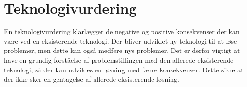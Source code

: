 \section{Teknologivurdering}
En teknologivurdering klarlægger de negative og positive konsekvenser der kan være ved en eksisterende teknologi. Der bliver udviklet ny teknologi til at løse problemer, men dette kan også medføre nye problemer. Det er derfor vigtigt at have en grundig forståelse af problemstillingen med den allerede eksisterende teknologi, så der kan udvikles en løsning med færre konsekvenser. Dette sikre at der ikke sker en gentagelse af allerede eksisterende løsning.\citep{PeterLarsen, ProTek}



